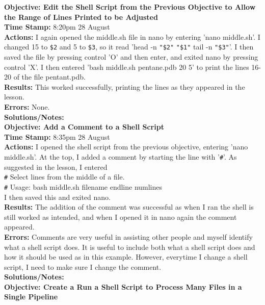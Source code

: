 \documentclass{article}
\begin{document}
\begin{FlushLeft}
\vspace{5mm}
\textbf{Objective: Edit the Shell Script from the Previous Objective to Allow the Range of Lines Printed to be Adjusted}\\ 
\textbf{Time Stamp:} 8:20pm 28 August\\
\textbf{Actions:} I again opened the middle.sh file in nano by entering 'nano middle.sh'. I changed 15 to \verb|$2| and 5 to \verb|$3|, so it read 'head -n \verb|"$2"| \verb|"$1"| \textbar{} tail -n \verb|"$3"|'. I then saved the file by pressing control 'O' and then enter, and exited nano by pressing control 'X'. I then entered 'bash middle.sh pentane.pdb 20 5' to print the lines 16-20 of the file pentant.pdb. \\
\textbf{Results:} This worked successfully, printing the lines as they appeared in the lesson. \\
\textbf{Errors:} None.\\
\textbf{Solutions/Notes:}\\
\vspace{5mm}
\textbf{Objective: Add a Comment to a Shell Script}\\ 
\textbf{Time Stamp:} 8:35pm 28 August\\
\textbf{Actions:} I opened the shell script from the previous objective, entering 'nano middle.sh'. At the top, I added a comment by starting the line with '\verb|#|'. As suggested in the lesson, I entered\\
\verb|#| Select lines from the middle of a file.\\
\verb|#| Usage: bash middle.sh filename end\textunderscore line num\textunderscore lines\\
I then saved this and exited nano.\\
\textbf{Results:} The addition of the comment was successful as when I ran the shell is still worked as intended, and when I opened it in nano again the comment appeared. \\
\textbf{Errors:} Comments are very useful in assisting other people and myself identify what a shell script does. It is useful to include both what a shell script does and how it should be used as in this example. However, everytime I change a shell script, I need to make sure I change the comment. \\
\textbf{Solutions/Notes:}\\
\vspace{5mm}
\textbf{Objective: Create a Run a Shell Script to Process Many Files in a Single Pipeline}\\ 

\end{FlushLeft}
\end{document}
